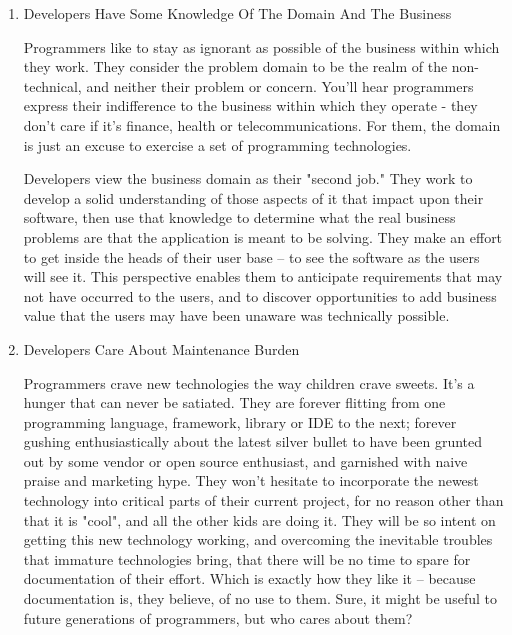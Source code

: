 \documentclass{article}
\begin{document}
\begin{enumerate}
\item Developers Have Some Knowledge Of The Domain And The Business
\label{sec:orgheadline125}

Programmers like to stay as ignorant as possible of the business within
which they work. They consider the problem domain to be the realm of the
non-technical, and neither their problem or concern. You'll hear
programmers express their indifference to the business within which they
operate - they don't care if it's finance, health or telecommunications.
For them, the domain is just an excuse to exercise a set of programming
technologies.

Developers view the business domain as their "second job." They work to
develop a solid understanding of those aspects of it that impact upon
their software, then use that knowledge to determine what the real
business problems are that the application is meant to be solving. They
make an effort to get inside the heads of their user base -- to see the
software as the users will see it. This perspective enables them to
anticipate requirements that may not have occurred to the users, and to
discover opportunities to add business value that the users may have
been unaware was technically possible.

\item Developers Care About Maintenance Burden
\label{sec:orgheadline126}

Programmers crave new technologies the way children crave sweets. It's a
hunger that can never be satiated. They are forever flitting from one
programming language, framework, library or IDE to the next; forever
gushing enthusiastically about the latest silver bullet to have been
grunted out by some vendor or open source enthusiast, and garnished with
naive praise and marketing hype. They won't hesitate to incorporate the
newest technology into critical parts of their current project, for no
reason other than that it is "cool", and all the other kids are doing
it. They will be so intent on getting this new technology working, and
overcoming the inevitable troubles that immature technologies bring,
that there will be no time to spare for documentation of their effort.
Which is exactly how they like it -- because documentation is, they
believe, of no use to them. Sure, it might be useful to future
generations of programmers, but who cares about them?


\end{enumerate}
\end{document}
